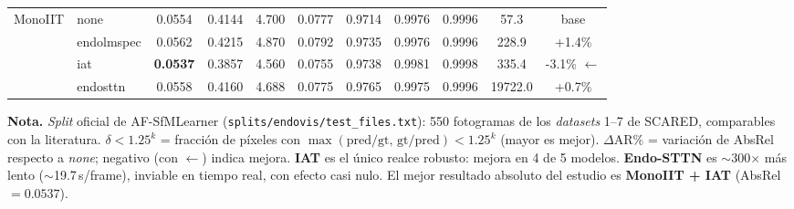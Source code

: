 \documentclass{article}
\begin{document}
\begin{table}[htbp]
\begin{tabular}{llccccccccc}
\midrule
\multirow{4}{*}{MonoIIT}
 & none & 0.0554 & 0.4144 & 4.700 & 0.0777 & 0.9714 & 0.9976 & 0.9996 & 57.3 & base \\
 & endolmspec & 0.0562 & 0.4215 & 4.870 & 0.0792 & 0.9735 & 0.9976 & 0.9996 & 228.9 & +1.4\% \\
 & iat & \textbf{0.0537} & 0.3857 & 4.560 & 0.0755 & 0.9738 & 0.9981 & 0.9998 & 335.4 & -3.1\% $\leftarrow$ \\
 & endosttn & 0.0558 & 0.4160 & 4.688 & 0.0775 & 0.9765 & 0.9975 & 0.9996 & 19722.0 & +0.7\% \\
\bottomrule
\end{tabular}

\vspace{0.6em}
\begin{minipage}{\linewidth}
    \footnotesize
    \textbf{Nota.} \textit{Split} oficial de AF-SfMLearner (\texttt{splits/endovis/test\_files.txt}): 550 fotogramas de los \textit{datasets} 1--7 de SCARED, comparables con la literatura. $\delta < 1.25^k$ = fracción de píxeles con $\max(\text{pred}/\text{gt},\,\text{gt}/\text{pred}) < 1.25^k$ (mayor es mejor). $\Delta\text{AR}\%$ = variación de AbsRel respecto a \textit{none}; negativo (con $\leftarrow$) indica mejora. \textbf{IAT} es el único realce robusto: mejora en 4 de 5 modelos. \textbf{Endo-STTN} es $\sim$300$\times$ más lento ($\sim$19.7\,s/frame), inviable en tiempo real, con efecto casi nulo. El mejor resultado absoluto del estudio es \textbf{MonoIIT + IAT} (AbsRel $=0.0537$).
\end{minipage}

\end{table}
\end{document}
